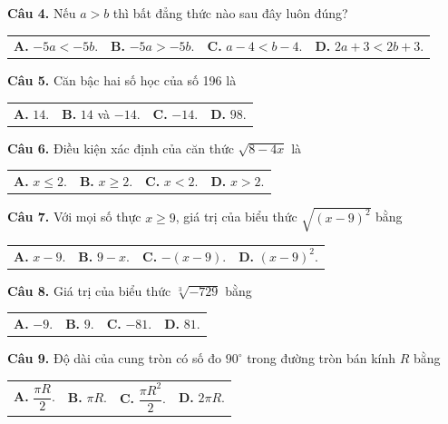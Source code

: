 \documentclass[11pt,a4paper]{article}
\begin{document}
\vspace{1.5mm}
\textbf{Câu 4.} Nếu $a > b$ thì bất đẳng thức nào sau đây luôn đúng?\\
\begin{tabularx}{\linewidth}{XXXX}
\textbf{A.} $-5a < -5b$. & \textbf{B.} $-5a > -5b$. & \textbf{C.} $a - 4 < b - 4$. & \textbf{D.} $2a + 3 < 2b + 3$.
\end{tabularx}

\vspace{1.5mm}
\textbf{Câu 5.} Căn bậc hai số học của số 196 là\\
\begin{tabularx}{\linewidth}{XXXX}
\textbf{A.} $14$. & \textbf{B.} $14$ và $-14$. & \textbf{C.} $-14$. & \textbf{D.} $98$.
\end{tabularx}

\vspace{1.5mm}
\textbf{Câu 6.} Điều kiện xác định của căn thức $\sqrt{8 - 4x}$ là\\
\begin{tabularx}{\linewidth}{XXXX}
\textbf{A.} $x \le 2$. & \textbf{B.} $x \ge 2$. & \textbf{C.} $x < 2$. & \textbf{D.} $x > 2$.
\end{tabularx}

\vspace{1.5mm}
\textbf{Câu 7.} Với mọi số thực $x \ge 9$, giá trị của biểu thức $\sqrt{(x-9)^2}$ bằng\\
\begin{tabularx}{\linewidth}{XXXX}
\textbf{A.} $x - 9$. & \textbf{B.} $9 - x$. & \textbf{C.} $-(x-9)$. & \textbf{D.} $(x-9)^2$.
\end{tabularx}

\vspace{1.5mm}
\textbf{Câu 8.} Giá trị của biểu thức $\sqrt[3]{-729}$ bằng\\
\begin{tabularx}{\linewidth}{XXXX}
\textbf{A.} $-9$. & \textbf{B.} $9$. & \textbf{C.} $-81$. & \textbf{D.} $81$.
\end{tabularx}

\vspace{1.5mm}
\textbf{Câu 9.} Độ dài của cung tròn có số đo $90^\circ$ trong đường tròn bán kính $R$ bằng\\
\begin{tabularx}{\linewidth}{XXXX}
\textbf{A.} $\dfrac{\pi R}{2}$. & \textbf{B.} $\pi R$. & \textbf{C.} $\dfrac{\pi R^2}{2}$. & \textbf{D.} $2\pi R$.
\end{tabularx}
\end{document}
